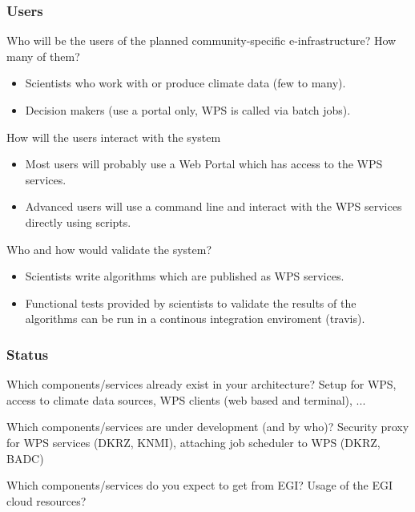 \documentclass{beamer}
\begin{document}

   \begin{frame}[plain]
    \frametitle{Users}
    \begin{block}{Who will be the users of the planned community-specific e-infrastructure? How many of them?}
      \begin{itemize}
        \item Scientists who work with or produce climate data (few to many).
        \item Decision makers (use a portal only, WPS is called via batch jobs).
      \end{itemize} 
    \end{block}
    \begin{block}{How will the users interact with the system} %
      \begin{itemize}
        \item Most users will probably use a Web Portal which has access to the WPS services.
        \item Advanced users will use a command line and interact with the WPS services directly using scripts.
      \end{itemize}
    \end{block}
    \begin{block}{Who and how would validate the system?}
      \begin{itemize}
        \item Scientists write algorithms which are published as WPS services.
        \item Functional tests provided by scientists to validate the results of the algorithms can be run in a continous integration enviroment (travis).
      \end{itemize}
    \end{block}
  \end{frame}


   \begin{frame}
    \frametitle{Status}
    \begin{block}{Which components/services already exist in your architecture?}
      Setup for WPS, access to climate data sources, WPS clients (web based and terminal), ...
    \end{block}
    \begin{block}{Which components/services are under development (and by who)?}
      Security proxy for WPS services (DKRZ, KNMI), attaching job scheduler to WPS (DKRZ, BADC) 
    \end{block}
    \begin{block}{Which components/services do you expect to get from EGI?}
      Usage of the EGI cloud resources?
    \end{block} 
  \end{frame}
\end{document}
